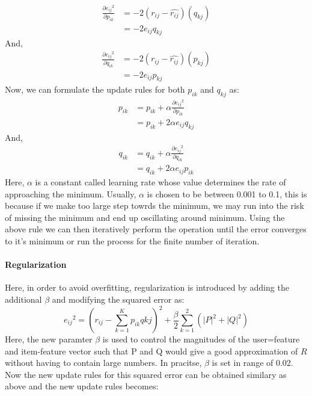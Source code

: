 \begin{equation}
\begin{split}
	\frac{\partial {e_{ij}}^2}{\partial p_{ik}} & = -2(r_{ij}-\widehat{r_{ij}})(q_{kj}) \\
	& = -2e_{ij}q_{kj}
\end{split}
\end{equation}
And,
\begin{equation}
\begin{split}
	\frac{\partial {e_{ij}}^2}{\partial q_{ik}} & = -2(r_{ij}-\widehat{r_{ij}})(p_{kj}) \\
	& = -2e_{ij}p_{kj}
\end{split}
\end{equation}
Now, we can formulate the update rules for both $p_{ik}$ and $q_{kj} $ as:
\begin{equation}
\begin{split}
	p_{ik} &= p_{ik} + \alpha \frac{\partial {e_{ij}}^2}{\partial p_{ik}} \\ 
	& = p_{ik}  + 2\alpha e_{ij} q_{kj}
\end{split}
\end{equation}
And,
\begin{equation}
\begin{split}
	q_{ik} &= q_{ik} + \alpha \frac{\partial {e_{ij}}^2}{\partial q_{ik}} \\ 
	& = q_{ik}  + 2\alpha e_{ij} p_{ik}
\end{split}
\end{equation}
Here, $\alpha$ is a constant called learning rate whose value determines the rate of approaching the minimum. Usually, $\alpha$ is chosen to be between 0.001 to 0.1, this is because if we make too large step towrds the minimum, we may run into the risk of missing the minimum and end up oscillating around minimum.
Using the above rule we can then iteratively perform the operation until the error converges to it's minimum or run the process for the finite number of iteration.
\paragraph{Regularization}\hfill

Here, in order to avoid overfitting, regularization is introduced by adding the additional $\beta$ and modifying the squared error as:
\begin{equation}
	{e_{ij}}^2  = (r_{ij} - \sum_{k=1}^K p_{ik}q{kj})^2 + \frac{\beta}{2}\sum_{k=1}^2(|P|^2 + |Q|^2)
\end{equation}
Here, the new paramter $\beta$ is used to control the magnitudes of the user=feature and item-feature vector such that P and Q would give a good approximation of $R$ without having to contain large numbers. In pracitse, $\beta$ is set in range of 0.02. Now the new update rules for this squared error can be obtained similary as above and the new update rules becomes:

